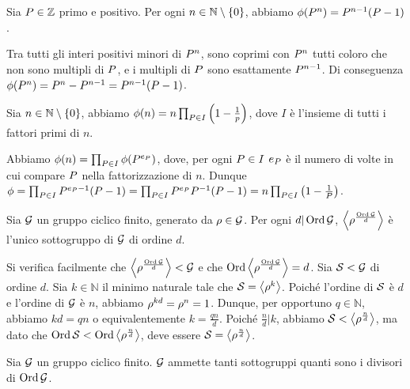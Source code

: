 \begin{Theorem}
	Sia $P \in \mathbb{Z}$ primo e positivo. Per ogni $n \in \mathbb{N} \setminus \lbrace 0 \rbrace$, abbiamo $\phi(P^n) = P^{n - 1}(P - 1)$.
\end{Theorem}
\Proof Tra tutti gli interi positivi minori di $P^n$, sono coprimi con $P^n$ tutti coloro che non sono multipli di $P$, e i multipli di $P$ sono esattamente $P^{n - 1}$. Di conseguenza $\phi(P^n) = P^n - P^{n - 1} = P^{n - 1}(P - 1)$. \EndProof
\begin{Theorem}
	Sia $n \in \mathbb{N} \setminus \lbrace 0 \rbrace$, abbiamo $\phi(n) = n \prod_{P \in I} \left ( 1 - \frac{1}{p} \right )$, dove $I$ \`e l'insieme di tutti i fattori primi di $n$.
\end{Theorem}
\Proof Abbiamo $\phi(n) = \prod_{P \in I} \phi(P^{e_P})$, dove, per ogni $P \in I$ $e_P$ \`e il numero di volte in cui compare $P$ nella fattorizzazione di $n$. Dunque $\phi = \prod_{P \in I} P^{e_P - 1}(P - 1) = \prod_{P \in I} P^{e_P} P^{- 1}(P - 1) = n \prod_{P \in I} \left ( 1 - \frac{1}{P} \right )$. \EndProof
\begin{Theorem}
	Sia $\mathcal{G}$ un gruppo ciclico finito,
	generato da $\rho \in \mathcal{G}$.
	Per ogni $d | \operatorname{\operatorname{Ord}}{\mathcal{G}}$,
	$\left < \rho^{\frac{\operatorname{\operatorname{Ord}}{\mathcal{G}}}{d}} \right >$
	\`e l'unico sottogruppo di $\mathcal{G}$ di ordine $d$.
\end{Theorem}
\Proof
Si verifica facilmente che
$\left < \rho^{\frac{\operatorname{\operatorname{Ord}}{\mathcal{G}}}{d}} \right > <
\mathcal{G}$ e che
$\operatorname{\operatorname{Ord}}{\left < \rho^{\frac{\operatorname{\operatorname{Ord}}{\mathcal{G}}}{d}} \right >} = d$.
Sia $\mathcal{S} < \mathcal{G}$ di ordine $d$.
Sia $k \in \mathbb{N}$ il minimo naturale tale che
$\mathcal{S} = \left < \rho^k \right >$.
Poich\'e l'ordine di $\mathcal{S}$ \`e $d$ e
l'ordine di $\mathcal{G}$ \`e $n$,
abbiamo
$\rho^{kd} = \rho^{n} = 1$.
Dunque, per opportuno $q \in \mathbb{N}$, abbiamo
$kd = qn$ o equivalentemente $k = \frac{qn}{d}$.
Poich\'e $\frac{n}{d} | k$, abbiamo
$\mathcal{S} < \left < \rho^{\frac{n}{d}} \right >$,
ma dato che
$\operatorname{\operatorname{Ord}}{\mathcal{S}} < \operatorname{\operatorname{Ord}}{\left < \rho^{\frac{n}{d}} \right >}$,
deve essere
$\mathcal{S} = \left < \rho^{\frac{n}{d}} \right >$.
\EndProof
\begin{Corollary}
	Sia $\mathcal{G}$ un gruppo ciclico finito.
	$\mathcal{G}$ ammette tanti sottogruppi
	quanti sono i divisori di $\operatorname{\operatorname{Ord}}{\mathcal{G}}$.
\end{Corollary}
